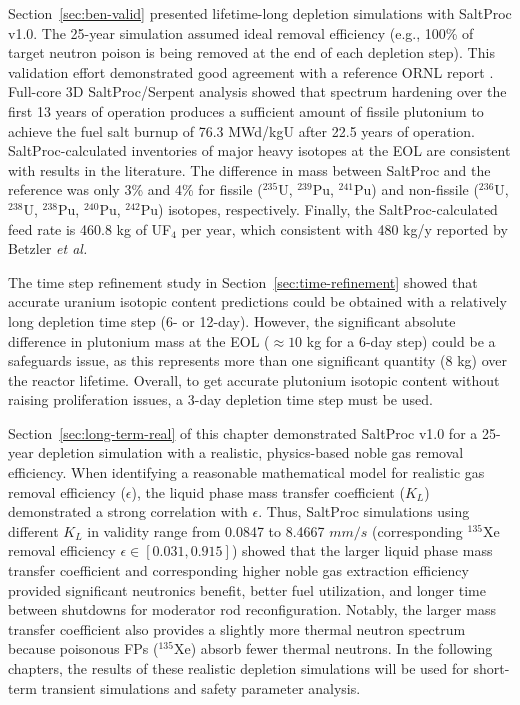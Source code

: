 Section~\ref{sec:ben-valid} presented lifetime-long depletion simulations with 
SaltProc v1.0. The 25-year simulation assumed ideal removal efficiency 
(e.g., 100\% of target neutron poison is being removed at the end of each 
depletion step). This validation effort demonstrated good agreement with a 
reference ORNL report \cite{betzler_assessment_2017-1}. Full-core 3D 
SaltProc/Serpent analysis showed that spectrum hardening over the first 13 
years of operation produces a sufficient amount of fissile plutonium to 
achieve the fuel salt burnup of 76.3 MWd/kgU after 22.5 years of operation. 
SaltProc-calculated inventories of major heavy isotopes at the \gls{EOL} are 
consistent with results in the literature. The difference in mass between 
SaltProc and the reference was only 3\% and 4\% for fissile ($^{235}$U, 
$^{239}$Pu, $^{241}$Pu) and non-fissile ($^{236}$U, $^{238}$U, $^{238}$Pu, 
$^{240}$Pu, $^{242}$Pu) isotopes, respectively. Finally, the 
SaltProc-calculated feed rate is 460.8 kg of UF$_4$ per year, which consistent 
with 480 kg/y reported by Betzler \emph{et al.} 
\cite{betzler_assessment_2017-1}

The time step refinement study in Section~\ref{sec:time-refinement} showed 
that accurate uranium isotopic content predictions could be obtained with a 
relatively long depletion time step (6- or 12-day). However, the significant 
absolute difference in plutonium mass at the \gls{EOL} ($\approx10$ kg for a 
6-day step) could be a safeguards issue, as this represents more than one 
significant quantity (8 kg) over the reactor lifetime. Overall, to get 
accurate plutonium isotopic content without raising proliferation issues, a 
3-day depletion time step must be used.

Section~\ref{sec:long-term-real} of this chapter demonstrated SaltProc v1.0 
for a 25-year depletion simulation with a realistic, physics-based noble gas 
removal efficiency. When identifying a reasonable mathematical model 
for realistic gas removal efficiency ($\epsilon$), the liquid phase mass 
transfer coefficient ($K_L$) demonstrated a strong correlation with 
$\epsilon$. Thus, SaltProc simulations using different $K_L$ in validity range 
from 0.0847 to 8.4667 $mm/s$ (corresponding $^{135}$Xe removal efficiency 
$\epsilon\in [0.031,0.915]$) showed that the larger liquid phase mass transfer 
coefficient and corresponding higher noble gas extraction efficiency provided 
significant neutronics benefit, better fuel utilization, and longer time 
between shutdowns for moderator rod reconfiguration. Notably, the larger mass 
transfer coefficient also provides a slightly more thermal neutron spectrum 
because poisonous \glspl{FP} ($^{135}$Xe) absorb fewer thermal neutrons. In 
the following chapters, the results of these realistic depletion simulations 
will be used for short-term transient simulations and safety parameter 
analysis. 

